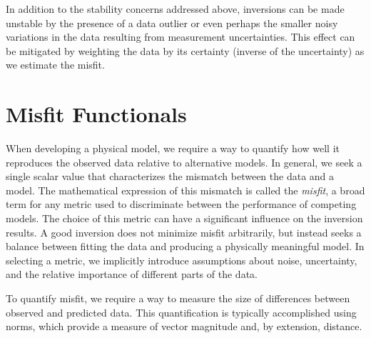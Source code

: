 In addition to the stability concerns addressed above, inversions can be made unstable by the presence of a data outlier or even perhaps the smaller noisy variations in the data resulting from measurement uncertainties.  This effect can be mitigated by weighting the data by its certainty (inverse of the uncertainty) as we estimate the misfit.


\section{Misfit Functionals} \label{sec:misfit}

When developing a physical model, we require a way to quantify how well it reproduces the observed data relative to alternative models. In general, we seek a single scalar value that characterizes the mismatch between the data and a model. The mathematical expression of this mismatch is called the \emph{misfit}, a broad term for any metric used to discriminate between the performance of competing models. The choice of this metric can have a significant influence on the inversion results. A good inversion does not minimize misfit arbitrarily, but instead seeks a balance between fitting the data and producing a physically meaningful model. In selecting a metric, we implicitly introduce assumptions about noise, uncertainty, and the relative importance of different parts of the data.

To quantify misfit, we require a way to measure the size of differences between observed and predicted data. This quantification is typically accomplished using norms, which provide a measure of vector magnitude and, by extension, distance.

